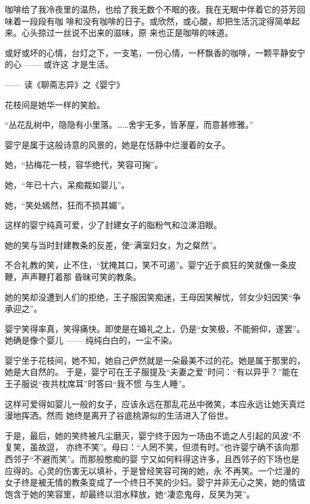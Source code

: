 \documentclass[12pt,a4paper]{article}
\begin{document}
		咖啡给了我冷夜里的温热，也给了我无数个不眠的夜。我在无眠中伴着它的芬芳回味着一段段有咖
	啡和没有咖啡的日子。或欣然，或心酸，却把生活沉淀得简单起来。心头掠过一丝说不出来的滋味，原
	来也正是咖啡的味道。

		或好或坏的心情，台灯之下，一支笔，一份心情，一杯飘香的咖啡，一颗平静安宁的心 —— 或许这
	才是生活。

	\endwriting



		—— 读《聊斋志异》之《婴宁》

		花枝间是她华一样的笑脸。\par
		“丛花乱树中，隐隐有小里落。……舍宇无多，皆茅屋，而意甚修雅。”\par
		婴宁是属于这般诗意的风景的，她是在恬静中烂漫着的女子。\par
		她，“拈梅花一枝，容华绝代，笑容可掬”。\par
		她，“年已十六，呆痴裁如婴儿”。\par
		她，“笑处嫣然，狂而不损其媚”。\par
		这样的婴宁纯真可爱，少了封建女子的脂粉气和泣涕泪眼。\par
		她的笑与当时封建教条的反差，使“满室妇女，为之粲然”。

		不合礼教的笑，止不住，“犹掩其口，笑不可遏”。婴宁近于疯狂的笑就像一条皮鞭，声声鞭打着那
	昏昧可笑的教条。

		她的笑却没遭到人们的拒绝，王子服因笑痴迷，王母因笑解忧，邻女少妇因笑“争承迎之”。

		婴宁笑得率真，笑得痛快。即使是在婚礼之上，仍是“女笑极，不能俯仰，遂罢”。她确是像个婴儿
	—— 纯纯白白的，一尘不染。

		婴宁坐于花枝间，她不知，她自己俨然就是一朵最美不过的花。她是属于那里的，她是大自然的。
	于是，婴宁可在王子服提及“夫妻之爱”时问：“有以异乎？”能在王子服说“夜共枕席耳”时答曰“我不惯
	与生人睡”。

		这样可爱得如婴儿一般的女子，应该永远在那乱花丛中微笑，本应永远让她天真烂漫地挥洒。然而
	她终是离开了谷底桃源似的生活进入了俗世。

		于是，最后，她的笑终被凡尘磨灭，婴宁终于因为一场由不诡之人引起的风波“不复笑，虽故逗，
	亦终不笑”。母曰：“人罔不笑，但须有时。”也许婴宁确不该向那西邻子“不避而笑”。而那般憨痴的婴
	宁又如何料得这许多，且西邻子的下场也是应得的。心灵的伤害无以填补，于是曾经笑容可掬的她，永
	不再笑。一个烂漫的女子终是被无情的教条变成了一个终日不笑的少妇。婴宁并非无心之笑，她的情谊
	饱含于她的笑容里，却最终以泪水释放，她“凄恋鬼母，反笑为哭”。
\end{document}
